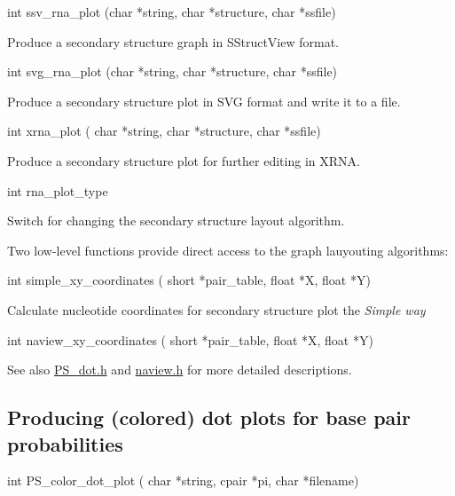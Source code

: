 \begin{DoxyVerb}int ssv_rna_plot (char *string,
                  char *structure,
                  char *ssfile)
\end{DoxyVerb}
 Produce a secondary structure graph in S\+Struct\+View format.

\begin{DoxyVerb}int svg_rna_plot (char *string,
                  char *structure,
                  char *ssfile)
\end{DoxyVerb}
 Produce a secondary structure plot in S\+VG format and write it to a file.

\begin{DoxyVerb}int xrna_plot ( char *string,
                char *structure,
                char *ssfile)
\end{DoxyVerb}
 Produce a secondary structure plot for further editing in X\+R\+NA.

\begin{DoxyVerb}int rna_plot_type
\end{DoxyVerb}
 Switch for changing the secondary structure layout algorithm.

Two low-\/level functions provide direct access to the graph lauyouting algorithms\+:

\begin{DoxyVerb}int simple_xy_coordinates ( short *pair_table,
                            float *X,
                            float *Y)
\end{DoxyVerb}
 Calculate nucleotide coordinates for secondary structure plot the {\itshape Simple way}

\begin{DoxyVerb}int naview_xy_coordinates ( short *pair_table,
                            float *X,
                            float *Y)
\end{DoxyVerb}


\begin{DoxySeeAlso}{See also}
\hyperlink{PS__dot_8h}{P\+S\+\_\+dot.\+h} and \hyperlink{naview_8h}{naview.\+h} for more detailed descriptions.
\end{DoxySeeAlso}
\hypertarget{plots_utils_dot}{}\subsection{Producing (colored) dot plots for base pair probabilities}\label{plots_utils_dot}
\begin{DoxyVerb}int PS_color_dot_plot ( char *string,
                        cpair *pi,
                        char *filename)
\end{DoxyVerb}



